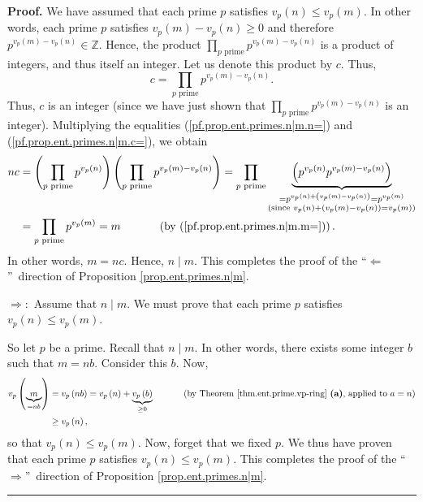 \documentclass[numbers=enddot,12pt,final,onecolumn,notitlepage]{scrartcl}%
\numberwithin{exer}{subsection}
\theoremstyle{definition}
\newenvironment{proof}[1][Proof]{\noindent\textbf{#1.} }{\ \rule{0.5em}{0.5em}}
\let\prodnonlimits\prod
\renewcommand{\prod}{\prodnonlimits\limits}
\begin{document}
\begin{proof}
We have assumed that each prime $p$ satisfies $v_{p}\left(  n\right)  \leq
v_{p}\left(  m\right)  $. In other words, each prime $p$ satisfies
$v_{p}\left(  m\right)  -v_{p}\left(  n\right)  \geq0$ and therefore
$p^{v_{p}\left(  m\right)  -v_{p}\left(  n\right)  }\in\mathbb{Z}$. Hence, the
product $\prod_{p\text{ prime}}p^{v_{p}\left(  m\right)  -v_{p}\left(
n\right)  }$ is a product of integers, and thus itself an integer. Let us
denote this product by $c$. Thus,%
\begin{equation}
c=\prod_{p\text{ prime}}p^{v_{p}\left(  m\right)  -v_{p}\left(  n\right)  }.
\label{pf.prop.ent.primes.n|m.c=}%
\end{equation}
Thus, $c$ is an integer (since we have just shown that $\prod_{p\text{ prime}%
}p^{v_{p}\left(  m\right)  -v_{p}\left(  n\right)  }$ is an integer).
Multiplying the equalities (\ref{pf.prop.ent.primes.n|m.n=}) and
(\ref{pf.prop.ent.primes.n|m.c=}), we obtain%
\begin{align*}
nc  &  =\left(  \prod_{p\text{ prime}}p^{v_{p}\left(  n\right)  }\right)
\left(  \prod_{p\text{ prime}}p^{v_{p}\left(  m\right)  -v_{p}\left(
n\right)  }\right)  =\prod_{p\text{ prime}}\underbrace{\left(  p^{v_{p}\left(
n\right)  }p^{v_{p}\left(  m\right)  -v_{p}\left(  n\right)  }\right)
}_{\substack{=p^{v_{p}\left(  n\right)  +\left(  v_{p}\left(  m\right)
-v_{p}\left(  n\right)  \right)  }=p^{v_{p}\left(  m\right)  }\\\text{(since
}v_{p}\left(  n\right)  +\left(  v_{p}\left(  m\right)  -v_{p}\left(
n\right)  \right)  =v_{p}\left(  m\right)  \text{)}}}\\
&  =\prod_{p\text{ prime}}p^{v_{p}\left(  m\right)  }%
=m\ \ \ \ \ \ \ \ \ \ \left(  \text{by (\ref{pf.prop.ent.primes.n|m.m=}%
)}\right)  .
\end{align*}
In other words, $m=nc$. Hence, $n\mid m$. This completes the proof of the
\textquotedblleft$\Longleftarrow$\textquotedblright\ direction of Proposition
\ref{prop.ent.primes.n|m}.

$\Longrightarrow:$ Assume that $n\mid m$. We must prove that each prime $p$
satisfies $v_{p}\left(  n\right)  \leq v_{p}\left(  m\right)  $.

So let $p$ be a prime. Recall that $n\mid m$. In other words, there exists
some integer $b$ such that $m=nb$. Consider this $b$. Now,%
\begin{align*}
v_{p}\left(  \underbrace{m}_{=nb}\right)   &  =v_{p}\left(  nb\right)
=v_{p}\left(  n\right)  +\underbrace{v_{p}\left(  b\right)  }_{\geq
0}\ \ \ \ \ \ \ \ \ \ \left(  \text{by Theorem \ref{thm.ent.prime.vp-ring}
\textbf{(a)}, applied to }a=n\right) \\
&  \geq v_{p}\left(  n\right)  ,
\end{align*}
so that $v_{p}\left(  n\right)  \leq v_{p}\left(  m\right)  $. Now, forget
that we fixed $p$. We thus have proven that each prime $p$ satisfies
$v_{p}\left(  n\right)  \leq v_{p}\left(  m\right)  $. This completes the
proof of the \textquotedblleft$\Longrightarrow$\textquotedblright\ direction
of Proposition \ref{prop.ent.primes.n|m}.
\end{proof}
\end{document}
